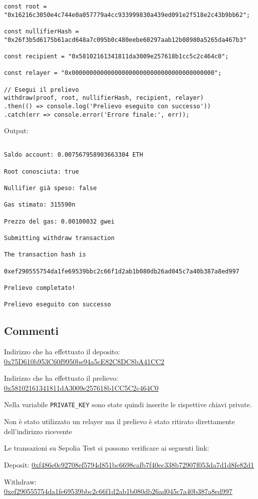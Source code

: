 \begin{lstlisting}
const root = "0x16216c3050e4c744e0a057779a4cc933999830a439ed091e2f518e2c43b9bb62";

const nullifierHash = "0x26f3b5d6175b61acd648a7c095b0c480eebe60297aab12b08980a5265da467b3"

const recipient = "0x58102161341811da3009e257618b1cc5c2c464c0";

const relayer = "0x0000000000000000000000000000000000000000";

// Esegui il prelievo
withdraw(proof, root, nullifierHash, recipient, relayer)
.then(() => console.log('Prelievo eseguito con successo'))
.catch(err => console.error('Errore finale:', err));
\end{lstlisting}

Output:

\begin{verbatim}

Saldo account: 0.007567958903663304 ETH

Root conosciuta: true

Nullifier già speso: false

Gas stimato: 315590n

Prezzo del gas: 0.00100032 gwei

Submitting withdraw transaction

The transaction hash is 

0xef290555754da1fe69539bbc2c66f1d2ab1b080db26ad045c7a40b387a8ed997

Prelievo completato!

Prelievo eseguito con successo
\end{verbatim}

\subsection{Commenti}

Indirizzo che ha effettuato il deposito: \href{https://sepolia.basescan.org/address/0x75D610b953C60f9950be94a5cE82C8DC8bA41CC2}{0x75D610b953C60f9950be94a5cE82C8DC8bA41CC2}

Indirizzo che ha effettuato il prelievo: \href{https://sepolia.basescan.org/address/0x58102161341811dA3009e257618b1CC5C2c464C0}{0x58102161341811dA3009e257618b1CC5C2c464C0}

Nella variabile \verb|PRIVATE_KEY| sono state quindi inserite le rispettive chiavi private.

Non è stato utilizzato un relayer ma il prelievo è stato ritirato direttamente dell'indirizzo ricevente

Le transazioni su Sepolia Test si possono verificare ai seguenti link:

Deposit: \href{https://sepolia.basescan.org/tx/0xf486e0c92708ef5794d851bc6698cafb7f40ec338b72907f053da7d1d8fe82d1}{0xf486e0c92708ef5794d851bc6698cafb7f40ec338b72907f053da7d1d8fe82d1}

Withdraw: \href{https://sepolia.basescan.org/tx/0xef290555754da1fe69539bbc2c66f1d2ab1b080db26ad045c7a40b387a8ed997}{0xef290555754da1fe69539bbc2c66f1d2ab1b080db26ad045c7a40b387a8ed997}